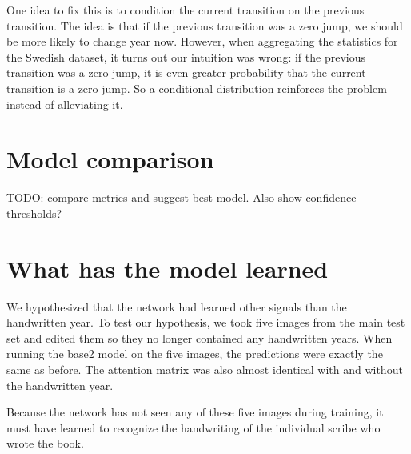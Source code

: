  One idea to fix this is to condition the current transition on the previous transition. The idea is that if the previous transition was a zero jump, we should be more likely to change year now. However, when aggregating the statistics for the Swedish dataset, it turns out our intuition was wrong: if the previous transition was a zero jump, it is even greater probability that the current transition is a zero jump. So a conditional distribution reinforces the problem instead of alleviating it.


\section{Model comparison}



TODO: compare metrics and suggest best model. Also show confidence thresholds?

\section{What has the model learned}




We hypothesized that the network had learned other signals than the handwritten year. To test our hypothesis, we took five images from the main test set and edited them so they no longer contained any handwritten years. When running the base2 model on the five images, the predictions were exactly the same as before. The attention matrix was also almost identical with and without the handwritten year.

Because the network has not seen any of these five images during training, it must have learned to recognize the handwriting of the individual scribe who wrote the book.
